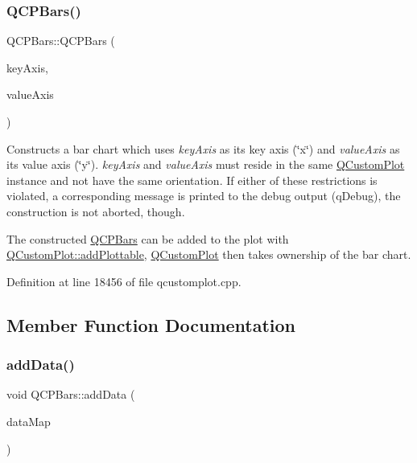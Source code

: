 \subsubsection{\texorpdfstring{Q\+C\+P\+Bars()}{QCPBars()}}
{\footnotesize\ttfamily Q\+C\+P\+Bars\+::\+Q\+C\+P\+Bars (\begin{DoxyParamCaption}\item[{\hyperlink{class_q_c_p_axis}{Q\+C\+P\+Axis} $\ast$}]{key\+Axis,  }\item[{\hyperlink{class_q_c_p_axis}{Q\+C\+P\+Axis} $\ast$}]{value\+Axis }\end{DoxyParamCaption})\hspace{0.3cm}{\ttfamily [explicit]}}

Constructs a bar chart which uses {\itshape key\+Axis} as its key axis (\char`\"{}x\char`\"{}) and {\itshape value\+Axis} as its value axis (\char`\"{}y\char`\"{}). {\itshape key\+Axis} and {\itshape value\+Axis} must reside in the same \hyperlink{class_q_custom_plot}{Q\+Custom\+Plot} instance and not have the same orientation. If either of these restrictions is violated, a corresponding message is printed to the debug output (q\+Debug), the construction is not aborted, though.

The constructed \hyperlink{class_q_c_p_bars}{Q\+C\+P\+Bars} can be added to the plot with \hyperlink{class_q_custom_plot_ab7ad9174f701f9c6f64e378df77927a6}{Q\+Custom\+Plot\+::add\+Plottable}, \hyperlink{class_q_custom_plot}{Q\+Custom\+Plot} then takes ownership of the bar chart. 

Definition at line 18456 of file qcustomplot.\+cpp.



\subsection{Member Function Documentation}
\mbox{\label{class_q_c_p_bars_a1f29cf08615040993209147fa68de3f2}} 
\subsubsection{\texorpdfstring{add\+Data()}{addData()}\hspace{0.1cm}{\footnotesize\ttfamily [1/4]}}
{\footnotesize\ttfamily void Q\+C\+P\+Bars\+::add\+Data (\begin{DoxyParamCaption}\item[{const \hyperlink{qcustomplot_8h_aa846c77472cae93def9f1609d0c57191}{Q\+C\+P\+Bar\+Data\+Map} \&}]{data\+Map }\end{DoxyParamCaption})}

